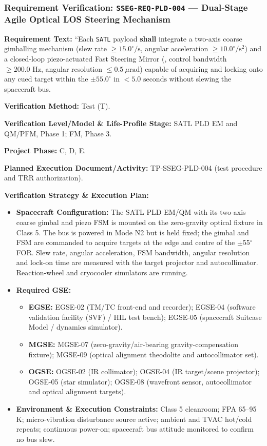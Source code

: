 \subsubsection{Requirement Verification: \texttt{SSEG-REQ-PLD-004} --- Dual-Stage Agile Optical LOS Steering Mechanism}
\label{ver:SSEG-REQ-PLD-004}
\textbf{Requirement Text:} ``Each \texttt{SATL} payload \textbf{shall} integrate a two-axis coarse gimballing mechanism (slew rate $\ge 15.0^\circ/\text{s}$, angular acceleration $\ge 10.0^\circ/\text{s}^2$) and a closed-loop piezo-actuated Fast Steering Mirror (, control bandwidth $\ge 200.0\text{ Hz}$, angular resolution $\le 0.5~\mu\mathrm{rad}$) capable of acquiring and locking onto any cued target within the $\pm 55.0^\circ$  in $< 5.0\text{ seconds}$ without slewing the spacecraft bus.
\par\textbf{Verification Method:} Test (T).
\par\textbf{Verification Level/Model \& Life-Profile Stage:} SATL PLD EM and QM/PFM, Phase 1; FM, Phase 3.
\par\textbf{Project Phase:} C, D, E.
\par\textbf{Planned Execution Document/Activity:} TP-SSEG-PLD-004 (test procedure and TRR authorization).
\par\textbf{Verification Strategy \& Execution Plan:}
\begin{itemize}
\item \textbf{Spacecraft Configuration:} The SATL PLD EM/QM with its two-axis coarse gimbal and piezo FSM is mounted on the zero-gravity optical fixture in Class 5. The bus is powered in Mode N2 but is held fixed; the gimbal and FSM are commanded to acquire targets at the edge and centre of the $\pm$55$^\circ$ FOR. Slew rate, angular acceleration, FSM bandwidth, angular resolution and lock-on time are measured with the target projector and autocollimator. Reaction-wheel and cryocooler simulators are running.
\item \textbf{Required GSE:}
\begin{itemize}
\item \textbf{EGSE:} EGSE-02 (TM/TC front-end and recorder); EGSE-04 (software validation facility (SVF) / HIL test bench); EGSE-05 (spacecraft Suitcase Model / dynamics simulator).
\item \textbf{MGSE:} MGSE-07 (zero-gravity/air-bearing gravity-compensation fixture); MGSE-09 (optical alignment theodolite and autocollimator set).
\item \textbf{OGSE:} OGSE-02 (IR collimator); OGSE-04 (IR target/scene projector); OGSE-05 (star simulator); OGSE-08 (wavefront sensor, autocollimator and optical alignment targets).
\end{itemize}
\item \textbf{Environment \& Execution Constraints:} Class 5 cleanroom; FPA 65--95 K; micro-vibration disturbance source active; ambient and TVAC hot/cold repeats; continuous power-on; spacecraft bus attitude monitored to confirm no bus slew.
\end{itemize}
